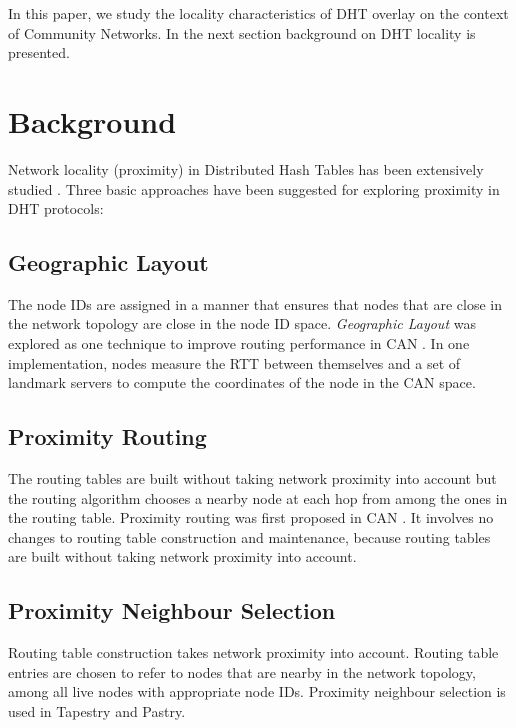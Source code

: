 \documentclass[conference]{IEEEtran}
\begin{document}
In this paper, we study the locality characteristics of DHT overlay on the context of Community Networks. In the next section background on DHT locality is presented.

\section{Background}

Network locality (proximity) in Distributed Hash Tables has been extensively studied \cite{b10, b11, b12, b31}. Three basic approaches have been suggested for exploring proximity in DHT protocols:

\subsection{Geographic Layout}

The node IDs are assigned in a manner that ensures that nodes that are close in the network topology are close in the node ID space. \textit{Geographic Layout} was explored as one technique to improve routing performance in CAN \cite{b4}. In one implementation, nodes measure the RTT between themselves and a set of landmark servers to compute the coordinates of the node in the CAN space.

\subsection{Proximity Routing}

The routing tables are built without taking network proximity into account but the routing algorithm chooses a nearby node at each hop from among the ones in the routing table. Proximity routing was first proposed in CAN \cite{b4}. It involves no changes to routing table construction and maintenance, because routing tables are built without taking network proximity into account.

\subsection{Proximity Neighbour Selection}

Routing table construction takes network proximity into account. Routing table entries are chosen to refer to nodes that are nearby in the network topology, among all live nodes with appropriate node IDs. Proximity neighbour selection is used in Tapestry and Pastry.
\end{document}
